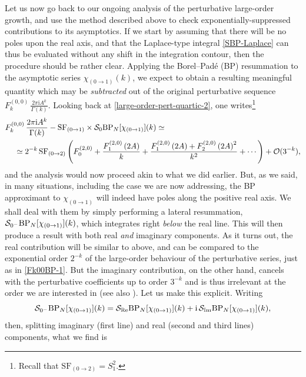 \documentclass[11pt,a4paper]{article}
\newcommand{\CS}{{\cal S}}
\newcommand{\be}{\begin{equation}}
\newcommand{\ee}{\end{equation}}
\newcommand{\bea}{\begin{eqnarray}}
\newcommand{\eea}{\end{eqnarray}}
\def\im{{\mathbb{I}}{\mathrm{m}}}
\def\re{{\mathbb{R}}{\mathrm{e}}}
\newcommand{\rmi}{{\mathrm{i}}}
\begin{document}
Let us now go back to our ongoing analysis of the perturbative large-order growth, and use the method described above to check exponentially-suppressed contributions to its asymptotics. If we start by assuming that there will be no poles upon the real axis, and that the Laplace-type integral \eqref{SBP-Laplace} can thus be evaluated without any shift in the integration contour, then the procedure should be rather clear. Applying the Borel--Pad\'e (BP) resummation to the asymptotic series $\chi_{(0\rightarrow1)} (k)$, we expect to obtain a resulting meaningful quantity which may be \textit{subtracted} out of the original perturbative sequence $F_k^{(0,0)}\, \frac{2\pi\rmi A^k}{\Gamma(k)}$. Looking back at \eqref{large-order-pert-quartic-2}, one writes\footnote{Recall that $\mathrm{SF}_{(0\rightarrow2)} = S_1^2$.}
%
\bea
\label{Fk00BP-1}
F_k^{(0,0)}\, \frac{2\pi\rmi A^k}{\Gamma(k)} - \mathrm{SF}_{(0\rightarrow1)} \times  \CS_0 \mathrm{BP}_{N} [\chi_{(0\rightarrow1)}] (k) &\simeq& \\
&&
\hspace{-200pt}
\simeq 2^{-k}\, \mathrm{SF}_{(0\rightarrow2)} \left( F_0^{(2,0)} + \frac{F_1^{(2,0)} \left( 2A \right)}{k} + \frac{F_1^{(2,0)} \left( 2A \right) + F_2^{(2,0)} \left( 2A \right)^2}{k^2} + \cdots \right) + \mathcal{O}(3^{-k}), \nonumber
\eea
%
\noindent
and the analysis would now proceed akin to what we did earlier. But, as we said, in many situations, including the case we are now addressing, the BP approximant to $\chi_{(0\rightarrow1)}$ will indeed have poles along the positive real axis. We shall deal with them by simply performing a lateral resummation, $\CS_{0^{-}} \mathrm{BP}_{N} [\chi_{(0\rightarrow1)}] (k)$, which integrates right \textit{below} the real line. This will then produce a result with both real \textit{and} imaginary components. As it turns out, the real contribution will be similar to above, and can be compared to the exponential order $2^{-k}$ of the large-order behaviour of the perturbative series, just as in \eqref{Fk00BP-1}. But the imaginary contribution, on the other hand, cancels with the perturbative coefficients up to order $3^{-k}$ and is thus irrelevant at the order we are interested in (see also \cite{asv11}). Let us make this explicit. Writing
%
\be
\label{S-BP=Re+Im-compare}
\CS_{0^{-}} \mathrm{BP}_{N} [\chi_{(0\rightarrow1)}] (k) = \CS_{\re} \mathrm{BP}_{N} [\chi_{(0\rightarrow1)}] (k) + \rmi\, \CS_{\im} \mathrm{BP}_{N} [\chi_{(0\rightarrow1)}] (k),
\ee
%
\noindent
then, splitting imaginary (first line) and real (second and third lines) components, what we find is
\end{document}
